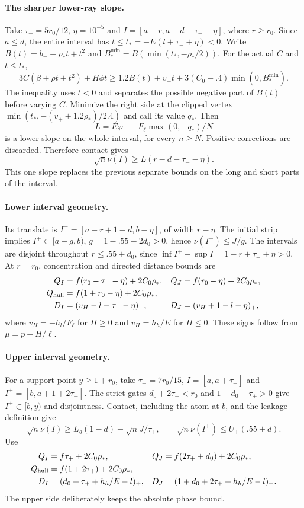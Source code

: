 \paragraph{The sharper lower-ray slope.}
Take $\tau_-=5r_0/12$, $\eta=10^{-5}$ and
$I=[a-r,a-d-\tau_--\eta]$, where $r\ge r_0$.
Since $a\le d$, the entire interval has
$t\le t_*=-E(l+\tau_-+\eta)<0$.
Write $B(t)=b_-+\rho_*t+t^2$ and
$B_*^{\min}=B(\min(t_*,-\rho_*/2))$. For the actual $C$ and $t\le t_*$,
\[
 3C(\beta+\rho t+t^2)+H\phi t
 \ge1.2B(t)+v_+t+3(C_0-.4)\min(0,B_*^{\min}).
\]
The inequality uses $t<0$ and separates the possible negative part of
$B(t)$ before varying $C$. Minimize the right side at the clipped vertex
$\min(t_*,-(v_++1.2\rho_*)/2.4)$ and call its value $q_*$. Then
\[
 L=E\varphi_--F_\ell\max(0,-q_*)/N
\]
is a lower slope on the whole interval, for every $n\ge N$.
Positive corrections are discarded. Therefore contact gives
\[
 \sqrt n\nu(I)\ge L(r-d-\tau_--\eta).
\]
This one slope replaces the previous separate bounds on the long and
short parts of the interval.

\paragraph{Lower interval geometry.}
Its translate is $I^+=[a-r+1-d,b-\eta]$, of width $r-\eta$.
The initial strip implies $I^+\subset[a+g,b)$,
$g=1-.55-2d_0>0$, hence $\nu(I^+)\le J/g$.
The intervals are disjoint throughout $r\le.55+d_0$, since
$\inf I^+-\sup I=1-r+\tau_-+\eta>0$.
At $r=r_0$, concentration and directed distance bounds are
\begin{align*}
 Q_I&=f(r_0-\tau_--\eta)+2C_0\rho_*,&
 Q_J&=f(r_0-\eta)+2C_0\rho_*,\\
 Q_{\rm hull}&=f(1+r_0-\eta)+2C_0\rho_*,\\
 D_I&=(v_H-l-\tau_--\eta)_+,&
 D_J&=(v_H+1-l-\eta)_+,
\end{align*}
where $v_H=-h_l/F_\ell$ for $H\ge0$ and $v_H=h_h/E$ for $H\le0$.
These signs follow from $\mu=p+H/\ell$.

\paragraph{Upper interval geometry.}
For a support point $y\ge1+r_0$, take $\tau_+=7r_0/15$,
$I=[a,a+\tau_+]$ and $I^+=[b,a+1+2\tau_+]$.
The strict gates $d_0+2\tau_+<r_0$ and $1-d_0-\tau_+>0$ give
$I^+\subset[b,y)$ and disjointness. Contact, including the atom at $b$,
and the leakage definition give
\[
 \sqrt n\nu(I)\ge L_g(1-d)-\sqrt nJ/\tau_+,\qquad
 \sqrt n\nu(I^+)\le U_+(.55+d).
\]
Use
\begin{align*}
 Q_I&=f\tau_++2C_0\rho_*,&Q_J&=f(2\tau_++d_0)+2C_0\rho_*,\\
 Q_{\rm hull}&=f(1+2\tau_+)+2C_0\rho_*,\\
 D_I&=(d_0+\tau_++h_h/E-l)_+,&
 D_J&=(1+d_0+2\tau_++h_h/E-l)_+.
\end{align*}
The upper side deliberately keeps the absolute phase bound.


